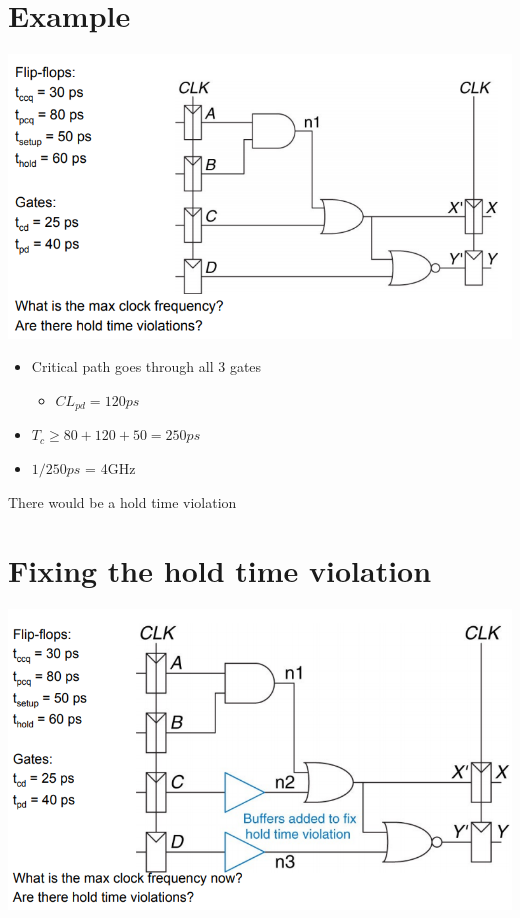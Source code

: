 \documentclass{article}[18pt]
\begin{document}
\section{Example}
\begin{center}
	\includegraphics[scale=0.7]{figure20}
\end{center}
\begin{itemize}
	\item Critical path goes through all 3 gates
	\begin{itemize}
		\item $CL_{pd}=120ps$
	\end{itemize}
	\item $T_c\geqslant80+120+50=250ps$
	\item $1/250ps$ = 4GHz
\end{itemize}
There would be a hold time violation


\section{Fixing the hold time violation}
\begin{center}
	\includegraphics[scale=0.7]{figure21}
\end{center}
\end{document}
